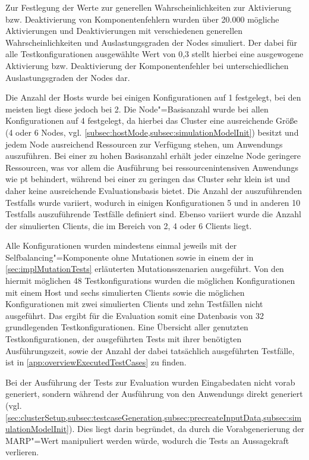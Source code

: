 Zur Festlegung der Werte zur generellen Wahrscheinlichkeiten zur Aktivierung bzw. Deaktivierung von Komponentenfehlern wurden über 20.000 mögliche Aktivierungen und Deaktivierungen mit verschiedenen generellen Wahrscheinlichkeiten und Auslastungsgraden der Nodes simuliert.
Der dabei für alle Testkonfigurationen ausgewählte Wert von 0,3 stellt hierbei eine ausgewogene Aktivierung bzw. Deaktivierung der Komponentenfehler bei unterschiedlichen Auslastungsgraden der Nodes dar.

Die Anzahl der Hosts wurde bei einigen Konfigurationen auf 1 festgelegt, bei den meisten liegt diese jedoch bei 2.
Die Node"=Basisanzahl wurde bei allen Konfigurationen auf 4 festgelegt, da hierbei das Cluster eine ausreichende Größe (4 oder 6 Nodes, vgl. \cref{subsec:hostMode,subsec:simulationModelInit}) besitzt und jedem Node ausreichend Ressourcen zur Verfügung stehen, um \glspl{Anwendung} auszuführen.
Bei einer zu hohen Basisanzahl erhält jeder einzelne Node geringere Ressourcen, was vor allem die Ausführung bei ressourcenintensiven \glspl{Anwendung} wie \zB \acrlong{pt} behindert, während bei einer zu geringen das Cluster sehr klein ist und daher keine ausreichende Evaluationsbasis bietet.
Die Anzahl der auszuführenden \glspl{Testfall} wurde variiert, wodurch in einigen Konfigurationen 5 und in anderen 10 \glspl{Testfall} auszuführende Testfälle definiert sind.
Ebenso variiert wurde die Anzahl der simulierten Clients, die im Bereich von 2, 4 oder 6 Clients liegt.

Alle Konfigurationen wurden mindestens einmal jeweils mit der Selfbalancing"=Komponente ohne Mutationen sowie in einem der in \cref{sec:implMutationTests} erläuterten Mutationsszenarien ausgeführt.
Von den hiermit möglichen 48 \glspl{Testkonfiguration} wurden die möglichen Konfigurationen mit einem Host und sechs simulierten Clients sowie die möglichen Konfigurationen mit zwei simulierten Clients und zehn Testfällen nicht ausgeführt.
Das ergibt für die Evaluation somit eine Datenbasis von 32 grundlegenden Testkonfigurationen.
Eine Übersicht aller genutzten Testkonfigurationen, der ausgeführten Tests mit ihrer benötigten Ausführungszeit, sowie der Anzahl der dabei tatsächlich ausgeführten Testfälle, ist in \cref{app:overviewExecutedTestCases} zu finden.

Bei der Ausführung der \glspl{Test} zur Evaluation wurden Eingabedaten nicht vorab generiert, sondern während der Ausführung von den \glspl{Anwendung} direkt generiert (vgl. \cref{sec:clusterSetup,subsec:testcaseGeneration,subsec:precreateInputData,subsec:simulationModelInit}).
Dies liegt darin begründet, da durch die Vorabgenerierung der \gls{MARP}"=Wert manipuliert werden würde, wodurch die Tests an Aussagekraft verlieren.

